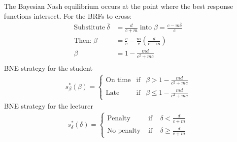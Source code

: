\documentclass[11pt,preprint, authoryear]{elsarticle}
\numberwithin{equation}{section}
\numberwithin{figure}{section}
\numberwithin{table}{section}
\begin{document}
The Bayesian Nash equilibrium occurs at the point where the best
response functions intersect. For the BRFs to cross: \begin{align*}
\text{Substitute} \; \bar{\delta} &= \frac{d}{c+m} \; \text{into} \; \beta=\frac{c-m\bar{\delta}}{c} \\
\text{Then:} \; \beta&=\frac{c}{c}-\frac{m}{c}\left(\frac{d}{c+m}\right) \\
\beta&=1-\frac{m d}{c^{2}+m c} \\
\end{align*} BNE strategy for the student \begin{align*}
s_{\beta}^{*}(\beta)=\left\{\begin{array}{lll}
\text{On time} & \text{if} & \beta>1-\frac{m d}{c^{2}+m c} \\
\text{Late} & \text{if} & \beta \leq 1-\frac{m d}{c^{2}+m c}
\end{array}\right.
\end{align*} BNE strategy for the lecturer \begin{align*}
s_{\delta}^{*}(\delta)=\left\{\begin{array}{lll}
\text{Penalty} & \text { if } & \delta<\frac{d}{c+m} \\
\text{No penalty} & \text { if } & \delta \geq \frac{d}{c+m}
\end{array}\right.
\end{align*}


\end{document}
